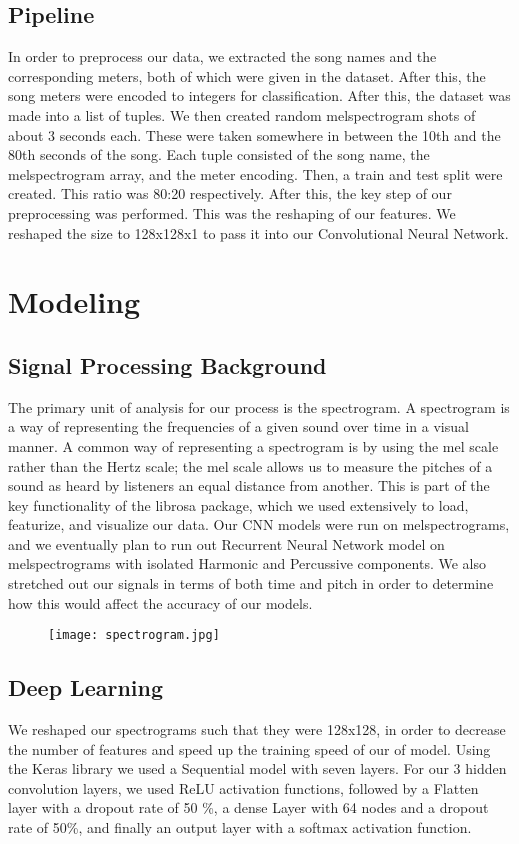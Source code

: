 \documentclass{article}
\begin{document}
\subsection{Pipeline}
In order to preprocess our data, we extracted the song names and the corresponding meters, both of which were given in the dataset. After this, the song meters were encoded to integers for classification. After this, the dataset was made into a list of tuples. We then created random melspectrogram shots of about 3 seconds each. These were taken somewhere in between the 10th and the 80th seconds of the song. Each tuple consisted of the song name, the melspectrogram array, and the meter encoding.
	Then, a train and test split were created. This ratio was 80:20 respectively. After this, the key step of our preprocessing was performed. This was the reshaping of our features. We reshaped the size to 128x128x1 to pass it into our Convolutional Neural Network.


\section{Modeling} 

\subsection{Signal Processing Background}
	The primary unit of analysis for our process is the spectrogram. A spectrogram is a way of representing the frequencies of a given sound over time in a visual manner. A common way of representing a spectrogram is by using the mel scale rather than the Hertz scale; the mel scale allows us to measure the pitches of a sound as heard by listeners an equal distance from another. This is part of the key functionality of the librosa package, which we used extensively to load, featurize, and visualize our data. 
	Our CNN models were run on melspectrograms, and we eventually plan to run out Recurrent Neural Network model on melspectrograms with isolated Harmonic and Percussive components. We also stretched out our signals in terms of both time and pitch in order to determine how this would affect the accuracy of our models. 

\begin{figure}[ht!]
\centering
\texttt{[image: spectrogram.jpg]}
\end{figure}

\subsection{Deep Learning}
 We reshaped our spectrograms such that they were 128x128, in order to decrease the number of features and speed up the training speed of our of model. Using the Keras library we used a Sequential model with seven layers. For our 3 hidden convolution layers, we used ReLU activation functions, followed by a Flatten layer with a dropout rate of 50 \%, a dense Layer with 64 nodes and a dropout rate of 50\%, and finally an output layer with a softmax activation function. 
\end{document}
